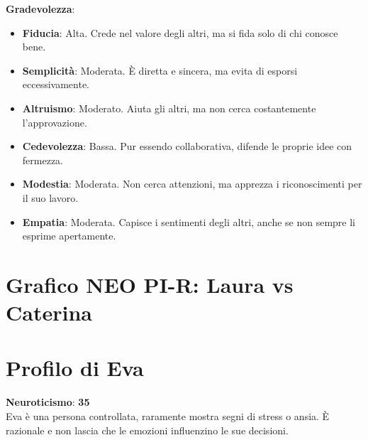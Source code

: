 \textbf{Gradevolezza}:
\begin{itemize}
    \item \textbf{Fiducia}: Alta. Crede nel valore degli altri, ma si fida solo di chi conosce bene.
    \item \textbf{Semplicità}: Moderata. È diretta e sincera, ma evita di esporsi eccessivamente.
    \item \textbf{Altruismo}: Moderato. Aiuta gli altri, ma non cerca costantemente l'approvazione.
    \item \textbf{Cedevolezza}: Bassa. Pur essendo collaborativa, difende le proprie idee con fermezza.
    \item \textbf{Modestia}: Moderata. Non cerca attenzioni, ma apprezza i riconoscimenti per il suo lavoro.
    \item \textbf{Empatia}: Moderata. Capisce i sentimenti degli altri, anche se non sempre li esprime apertamente.
\end{itemize}

\newpage
\section*{Grafico NEO PI-R: Laura vs Caterina}


\newpage

\section*{Profilo di Eva}

\textbf{Neuroticismo}: \textbf{35} \\
Eva è una persona controllata, raramente mostra segni di stress o ansia. È razionale e non lascia che le emozioni influenzino le sue decisioni. \\

